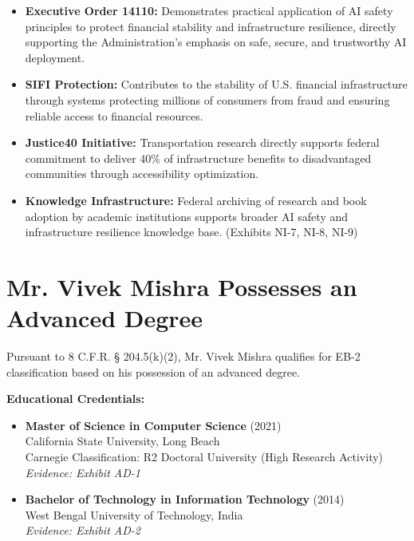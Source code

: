 \documentclass[11pt]{article}
\newcommand{\dr}{Mr. Vivek Mishra }
\begin{document}
\begin{itemize}
    \item \textbf{Executive Order 14110:} Demonstrates practical application of AI safety 
    principles to protect financial stability and infrastructure resilience, directly supporting 
    the Administration's emphasis on safe, secure, and trustworthy AI deployment.
    
    \item \textbf{SIFI Protection:} Contributes to the stability of U.S. financial infrastructure 
    through systems protecting millions of consumers from fraud and ensuring reliable access to 
    financial resources.
    
    \item \textbf{Justice40 Initiative:} Transportation research directly supports federal 
    commitment to deliver 40\% of infrastructure benefits to disadvantaged communities through 
    accessibility optimization.
    
    \item \textbf{Knowledge Infrastructure:} Federal archiving of research and book adoption by 
    academic institutions supports broader AI safety and infrastructure resilience knowledge 
    base. (Exhibits NI-7, NI-8, NI-9)
\end{itemize}

\pagebreak


\section{\dr Possesses an Advanced Degree}
\label{sec:advdegree}

Pursuant to 8 C.F.R. § 204.5(k)(2), \dr qualifies for EB-2 classification based on his possession of an advanced degree.

\textbf{Educational Credentials:}

\begin{itemize}
    \item \textbf{Master of Science in Computer Science} (2021)\\
    California State University, Long Beach\\
    Carnegie Classification: R2 Doctoral University (High Research Activity)\\
    \textit{Evidence: Exhibit AD-1}
    
    \item \textbf{Bachelor of Technology in Information Technology} (2014)\\
    West Bengal University of Technology, India\\
    \textit{Evidence: Exhibit AD-2}
\end{itemize}
\end{document}
